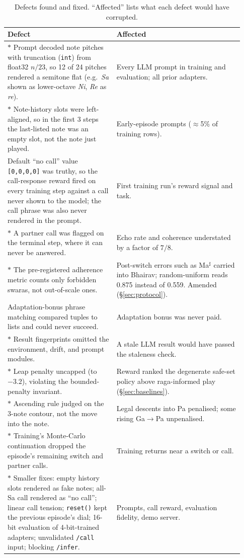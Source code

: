 \documentclass[11pt]{article}
\newcommand{\sw}[1]{\textit{#1}}  %
\begin{document}
\begin{table}[t]
\centering\small
\caption{Defects found and fixed. ``Affected'' lists what each defect would have corrupted.}
\label{tab:audit}
\begin{tabular}{@{}p{0.43\linewidth}p{0.5\linewidth}@{}}
\toprule
Defect & Affected \\
\midrule
$\ast$ Prompt decoded note pitches with truncation (\texttt{int}) from float32 $n/23$, so 12 of 24 pitches rendered a semitone flat (e.g.\ \sw{Sa} shown as lower-octave \sw{Ni}, \sw{Re} as \sw{re}). & Every LLM prompt in training and evaluation; all prior adapters. \\
$\ast$ Note-history slots were left-aligned, so in the first 3 steps the last-listed note was an empty slot, not the note just played. & Early-episode prompts ($\approx$5\% of training rows). \\
Default ``no call'' value \texttt{[0,0,0,0]} was truthy, so the call-response reward fired on every training step against a call never shown to the model; the call phrase was also never rendered in the prompt. & First training run's reward signal and task. \\
$\ast$ A partner call was flagged on the terminal step, where it can never be answered. & Echo rate and coherence understated by a factor of $7/8$. \\
$\ast$ The pre-registered adherence metric counts only forbidden swaras, not out-of-scale ones. & Post-switch errors such as Ma$^\sharp$ carried into Bhairav; random-uniform reads 0.875 instead of 0.559. Amended (\S\ref{sec:protocol}). \\
Adaptation-bonus phrase matching compared tuples to lists and could never succeed. & Adaptation bonus was never paid. \\
$\ast$ Result fingerprints omitted the environment, drift, and prompt modules. & A stale LLM result would have passed the staleness check. \\
$\ast$ Leap penalty uncapped (to $-3.2$), violating the bounded-penalty invariant. & Reward ranked the degenerate safe-set policy above raga-informed play (\S\ref{sec:baselines}). \\
$\ast$ Ascending rule judged on the 3-note contour, not the move into the note. & Legal descents into Pa penalised; some rising Ga$\to$Pa unpenalised. \\
$\ast$ Training's Monte-Carlo continuation dropped the episode's remaining switch and partner calls. & Training returns near a switch or call. \\
$\ast$ Smaller fixes: empty history slots rendered as fake notes; all-Sa call rendered as ``no call''; linear call tension; \texttt{reset()} kept the previous episode's dial; 16-bit evaluation of 4-bit-trained adapters; unvalidated \texttt{/call} input; blocking \texttt{/infer}. & Prompts, call reward, evaluation fidelity, demo server. \\
\bottomrule
\end{tabular}
\end{table}
\end{document}
